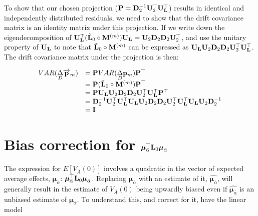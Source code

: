 \documentclass[12pt]{article}
\begin{document}
\begin{bibunit}
To show that our chosen projection (${\bf P} = {\bf D}_2^{-1}{\bf U}_2^{\top}{\bf U}_{\bf L}^{\top}$) results in identical and independently distributed residuals, we need to show that the drift covariance matrix is an identity matrix under this projection. If we write down the eigendecomposition of ${\bf U}_{\bf L}^{\top}(\tilde{\bf L}_{0}\circ{\bf M}^{(m)}){\bf U}_{\bf L} = {\bf U}_2{\bf D}_2{\bf D}_2{\bf U}_2^{\top}$, and use the unitary property of ${\bf U}_{\bf L}$ to note that $\tilde{\bf L}_{0}\circ{\bf M}^{(m)}$ can be expressed as ${\bf U}_{\bf L}{\bf U}_2{\bf D}_2{\bf D}_2{\bf U}_2^{\top}{\bf U}_{\bf L}^{\top}$. The drift covariance matrix under the projection is then:

\begin{equation} 
\begin{array}{rl}
VAR(\underset{D}\Delta \overrightarrow{\bf p}_m) &= {\bf P}VAR(\underset{D}\Delta {\bf p}_m){\bf P}^{\top}\\
&= {\bf P}(\tilde{\bf L}_{0}\circ{\bf M}^{(m)}){\bf P}^{\top}\\
&= {\bf P}{\bf U}_{\bf L}{\bf U}_2{\bf D}_2{\bf D}_2{\bf U}_2^{\top}{\bf U}_{\bf L}^{\top}{\bf P}^{\top}\\
&= {\bf D}_2^{-1}{\bf U}_2^{\top}{\bf U}_{\bf L}^{\top}{\bf U}_{\bf L}{\bf U}_2{\bf D}_2{\bf D}_2{\bf U}_2^{\top}{\bf U}_{\bf L}^{\top}{\bf U}_{\bf L}{\bf U}_2{\bf D}_2^{-1}\\
&= {\bf I}\\
\end{array}
\end{equation}

\section{Bias correction for $\boldsymbol{\mu}_{\bar{\alpha}}^{\top}{\bf L}_0\boldsymbol{\mu}_{\bar{\alpha}}$}
\label{App:bias_correction}

The expression for $E[V_{\bar A}(0)]$ involves a quadratic in the vector of expected average effects, $\boldsymbol{\mu}_{\bar{\alpha}}$: $\boldsymbol{\mu}_{\bar{\alpha}}^{\top}{\bf L}_0\boldsymbol{\mu}_{\bar{\alpha}}$. Replacing $\boldsymbol{\mu}_{\bar{\alpha}}$ with an estimate of it, $\widehat{\boldsymbol{\mu}_{\bar{\alpha}}}$, will generally result in the estimate of $V_{\bar A}(0)$ being upwardly biased even if $\widehat{\boldsymbol{\mu}_{\bar{\alpha}}}$ is an unbiased estimate of $\boldsymbol{\mu}_{\bar{\alpha}}$. To understand this, and correct for it, have the linear model


\end{bibunit}
\end{document}

